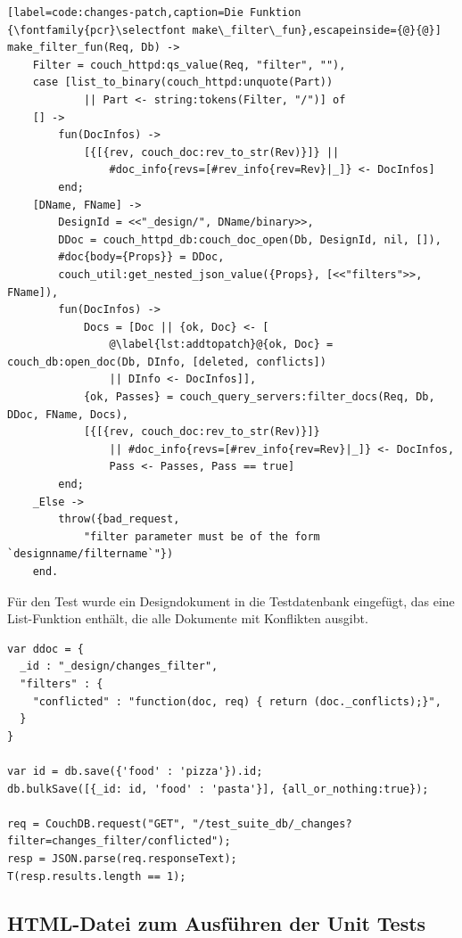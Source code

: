 \lstset{language=erlang}
\medskip
\begin{lstlisting}[label=code:changes-patch,caption=Die Funktion {\fontfamily{pcr}\selectfont make\_filter\_fun},escapeinside={@}{@}]
make_filter_fun(Req, Db) ->
    Filter = couch_httpd:qs_value(Req, "filter", ""),
    case [list_to_binary(couch_httpd:unquote(Part))
            || Part <- string:tokens(Filter, "/")] of
    [] ->
        fun(DocInfos) ->
            [{[{rev, couch_doc:rev_to_str(Rev)}]} ||
                #doc_info{revs=[#rev_info{rev=Rev}|_]} <- DocInfos]
        end;
    [DName, FName] ->
        DesignId = <<"_design/", DName/binary>>,
        DDoc = couch_httpd_db:couch_doc_open(Db, DesignId, nil, []),
        #doc{body={Props}} = DDoc,
        couch_util:get_nested_json_value({Props}, [<<"filters">>, FName]),
        fun(DocInfos) ->
            Docs = [Doc || {ok, Doc} <- [
                @\label{lst:addtopatch}@{ok, Doc} = couch_db:open_doc(Db, DInfo, [deleted, conflicts])
                || DInfo <- DocInfos]],
            {ok, Passes} = couch_query_servers:filter_docs(Req, Db, DDoc, FName, Docs),
            [{[{rev, couch_doc:rev_to_str(Rev)}]}
                || #doc_info{revs=[#rev_info{rev=Rev}|_]} <- DocInfos, 
                Pass <- Passes, Pass == true]
        end;
    _Else ->
        throw({bad_request, 
            "filter parameter must be of the form `designname/filtername`"})
    end.  
\end{lstlisting}


Für den Test wurde ein Designdokument in die Testdatenbank eingefügt, das eine List-Funktion enthält, die alle Dokumente mit Konflikten ausgibt.

\lstset{language=javascript}
\medskip
\begin{lstlisting}[label=code:changes-patch-test,caption=Test für die Funktion in Listing \ref{code:changes-patch-test}]
var ddoc = {
  _id : "_design/changes_filter",
  "filters" : {
    "conflicted" : "function(doc, req) { return (doc._conflicts);}",
  }
}

var id = db.save({'food' : 'pizza'}).id;
db.bulkSave([{_id: id, 'food' : 'pasta'}], {all_or_nothing:true});

req = CouchDB.request("GET", "/test_suite_db/_changes?filter=changes_filter/conflicted");
resp = JSON.parse(req.responseText);
T(resp.results.length == 1);
\end{lstlisting}





\subsection{HTML-Datei zum Ausführen der Unit Tests}


